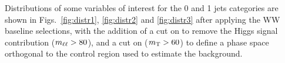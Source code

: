 Distributions of some variables of interest for the 0 and 1 jets categories are shown in Figs.~\ref{fig:distr1}, \ref{fig:distr2} and \ref{fig:distr3} after applying the WW baseline selections, with the addition of a cut on \mll to remove the Higgs signal contribution ($m_{\ell\ell} > 80$\GeV), and a cut on \mt ($m_\mathrm{T} > 60$\GeV) to define a phase space orthogonal to the control region used to estimate the \dytt background.

\begin{figure}
\centering
{}
\\
\end{figure}
